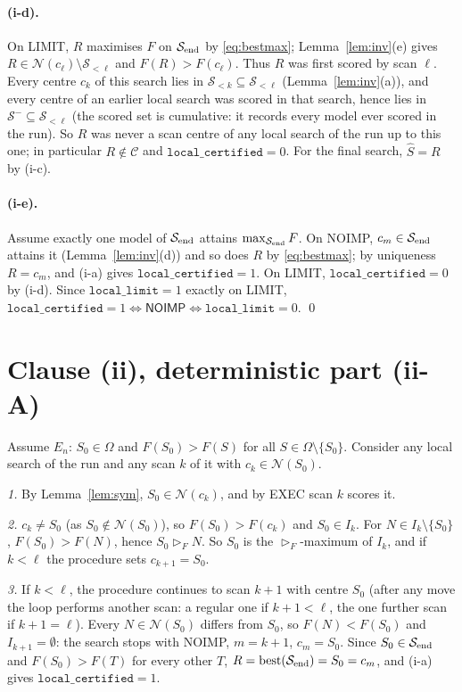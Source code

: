 \documentclass[11pt]{article}
\theoremstyle{remark}
\newcommand{\cS}{\mathcal{S}}
\newcommand{\cN}{\mathcal{N}}
\newcommand{\cC}{\mathcal{C}}
\newcommand{\best}{\operatorname{best}}
\newcommand{\NOIMP}{\textsf{NOIMP}}
\newcommand{\LIMIT}{\textsf{LIMIT}}
\newcommand{\cert}{\texttt{local\_certified}}
\newcommand{\llim}{\texttt{local\_limit}}
\begin{document}
\paragraph{(i-d).}
On \LIMIT, $R$ maximises $F$ on $\cS_{\rm end}$ by \eqref{eq:bestmax}; Lemma~\ref{lem:inv}(e) gives $R\in\cN(c_\ell)\setminus\cS_{<\ell}$ and $F(R)>F(c_\ell)$. Thus $R$ was first scored by scan $\ell$. Every centre $c_k$ of this search lies in $\cS_{<k}\subseteq\cS_{<\ell}$ (Lemma~\ref{lem:inv}(a)), and every centre of an earlier local search was scored in that search, hence lies in $\cS^-\subseteq\cS_{<\ell}$ (the scored set is cumulative: it records every model ever scored in the run). So $R$ was never a scan centre of any local search of the run up to this one; in particular $R\notin\cC$ and $\cert=0$. For the final search, $\hat S=R$ by (i-c).

\paragraph{(i-e).}
Assume exactly one model of $\cS_{\rm end}$ attains $\max_{\cS_{\rm end}}F$. On \NOIMP, $c_m\in\cS_{\rm end}$ attains it (Lemma~\ref{lem:inv}(d)) and so does $R$ by \eqref{eq:bestmax}; by uniqueness $R=c_m$, and (i-a) gives $\cert=1$. On \LIMIT, $\cert=0$ by (i-d). Since $\llim=1$ exactly on \LIMIT, $\cert=1\iff\NOIMP\iff\llim=0$. \qed

\section{Clause (ii), deterministic part (ii-A)}

Assume $E_n$: $S_0\in\Omega$ and $F(S_0)>F(S)$ for all $S\in\Omega\setminus\{S_0\}$. Consider any local search of the run and any scan $k$ of it with $c_k\in\cN(S_0)$.

\emph{1.} By Lemma~\ref{lem:sym}, $S_0\in\cN(c_k)$, and by EXEC scan $k$ scores it.

\emph{2.} $c_k\ne S_0$ (as $S_0\notin\cN(S_0)$), so $F(S_0)>F(c_k)$ and $S_0\in I_k$. For $N\in I_k\setminus\{S_0\}$, $F(S_0)>F(N)$, hence $S_0\rhd_F N$. So $S_0$ is the $\rhd_F$-maximum of $I_k$, and if $k<\ell$ the procedure sets $c_{k+1}=S_0$.

\emph{3.} If $k<\ell$, the procedure continues to scan $k+1$ with centre $S_0$ (after any move the loop performs another scan: a regular one if $k+1<\ell$, the one further scan if $k+1=\ell$). Every $N\in\cN(S_0)$ differs from $S_0$, so $F(N)<F(S_0)$ and $I_{k+1}=\emptyset$: the search stops with \NOIMP, $m=k+1$, $c_m=S_0$. Since $S_0\in\cS_{\rm end}$ and $F(S_0)>F(T)$ for every other $T$, $R=\best(\cS_{\rm end})=S_0=c_m$, and (i-a) gives $\cert=1$.
\end{document}
